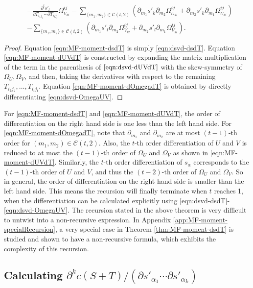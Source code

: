 \begin{theorem}
\begin{subequations}
\begin{align}
			&- \frac{\partial^t s'_l}{\partial T_{i_1j_1} \cdots \partial T_{i_tj_t}}\Omega_{V_{kl}}^{ij} - \sum_{\{m_1,m_2\}\in\mathcal{C}(t,2)} \left( \partial_{m_1}s'_k\partial_{m_2}\Omega_{U_{kl}}^{ij} + \partial_{m_2}s'_k\partial_{m_1}\Omega_{U_{kl}}^{ij} \right) \nonumber \\
			&- \sum_{\{m_1,m_2\}\in\mathcal{C}(t,2)} \left( \partial_{m_1}s'_l\partial_{m_2}\Omega_{V_{kl}}^{ij} + \partial_{m_2}s'_l\partial_{m_1}\Omega_{V_{kl}}^{ij} \right).
		\end{align}
	\end{subequations}
\end{theorem}
\begin{proof}
	Equation \eqref{eqn:MF-moment-dsdT} is simply \eqref{eqn:dsvd-dsdT}.
	Equation \eqref{eqn:MF-moment-dUVdT} is constructed by expanding the matrix multiplication of the term in the parenthesis of $\eqref{eqn:dsvd-dUVdT}$ with the skew-symmetry of $\Omega_U, \Omega_V$, and then, taking the derivatives with respect to the remaining $T_{i_2 j_2},\ldots, T_{i_tj_t}$. 
	Equation \eqref{eqn:MF-moment-dOmegadT} is obtained by directly differentiating \eqref{eqn:dsvd-OmegaUV}.
\end{proof}

For \eqref{eqn:MF-moment-dsdT} and \eqref{eqn:MF-moment-dUVdT}, the order of differentiation on the right hand side is one less than the left hand side.
For \eqref{eqn:MF-moment-dOmegadT}, note that $\partial_{m_1}$ and $\partial_{m_2}$ are at most $(t-1)$-th order for $(m_1,m_2)\in\mathcal{C}(t,2)$.
Also, the $t$-th order differentiation of $U$ and $V$ is reduced to at most the $(t-1)$-th order of $\Omega_U$ and $\Omega_V$ as shown in \eqref{eqn:MF-moment-dUVdT}.
Similarly, the $t$-th order differentiation of $s_\alpha$ corresponds to the $(t-1)$-th order of $U$ and $V$, and thus the $(t-2)$-th order of $\Omega_U$ and $\Omega_V$.
So in general, the order of differentiation on the right hand side is smaller than the left hand side.
This means the recursion will finally terminate when $t$ reaches 1, when the differentiation can be calculated explicitly using \eqref{eqn:dsvd-dsdT}-\eqref{eqn:dsvd-OmegaUV}.
The recursion stated in the above theorem is very difficult to untwist into a non-recursive expression.
In Appendix \ref{app:MF-moment-specialRecursion}, a very special case in Theorem \ref{thm:MF-moment-dsdT} is studied and shown to have a non-recursive formula, which exhibits the complexity of this recursion.

\subsection{Calculating $\partial^k c(S+T)/ (\partial s'_{\alpha_1} \cdots \partial s'_{\alpha_k})$}

